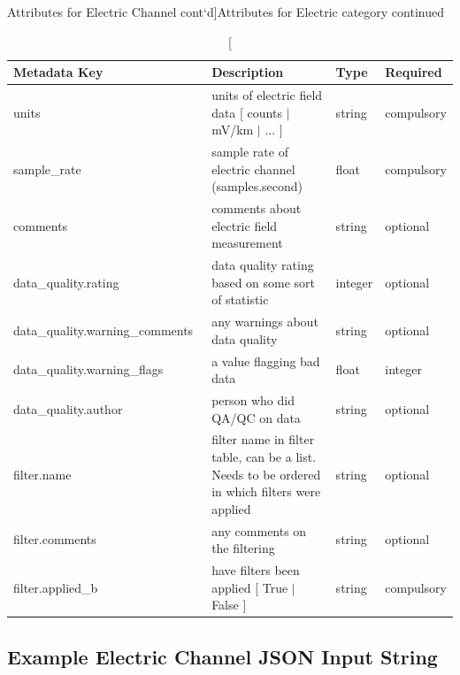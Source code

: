 \documentclass{article}
\begin{document}
\newpage
\begin{table}[htb!]
    \caption[Attributes for Electric Channel cont`d]{Attributes for Electric category continued}
    \begin{tabular}{|l|p{3in}|l|l|}
        \hline
        \textbf{Metadata Key} & \textbf{Description} & \textbf{Type} & \textbf{Required} \\ \hline
        units\ & units of electric field data [ counts $|$ mV/km $|$ ... ] & string & compulsory \\ \hline
        sample\_rate\ & sample rate of electric channel (samples.second) & float & compulsory \\ \hline
        comments\ & comments about electric field measurement & string &  optional \\ \hline
        data\_quality.rating\ & data quality rating based on some sort of statistic & integer & optional \\ \hline
        data\_quality.warning\_comments\ & any warnings about data quality & string & optional \\ \hline
        data\_quality.warning\_flags\ & a value flagging bad data  & float &  integer \\ \hline
        data\_quality.author\ & person who did QA/QC on data & string &  optional \\ \hline
        filter.name\ & filter name in filter table, can be a list. Needs to be ordered in which filters were applied & string &  optional \\ \hline
        filter.comments\ & any comments on the filtering & string &  optional \\ \hline
        filter.applied\_b & have filters been applied [ True $|$ False ] & string & compulsory \\ \hline
        \end{tabular}
        \label{tab:electric02}
\end{table}    

\newpage
\subsection{Example Electric Channel JSON Input String}
\end{document}
